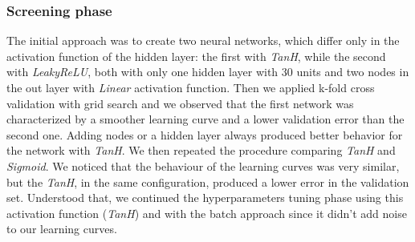 \subsubsection{Screening phase}\label{subsubsec:screeningPhase}
The initial approach was to create two neural networks, which differ only in the activation function of the hidden layer: the first with \textit{TanH}, while the second with \textit{LeakyReLU}, both with only one hidden layer with 30 units and two nodes in the out layer with \textit{Linear} activation function. Then we applied k-fold cross validation with grid search and we observed that the first network was characterized by a smoother learning curve and a lower validation error than the second one. Adding nodes or a hidden layer always produced better behavior for the network with \textit{TanH}. We then repeated the procedure comparing \textit{TanH} and \textit{Sigmoid}. We noticed that the behaviour of the learning curves was very similar, but the \textit{TanH}, in the same configuration, produced a lower error in the validation set. Understood that, we continued the hyperparameters tuning phase using this activation function (\textit{TanH}) and with the batch approach since it didn't add noise to our learning curves.

